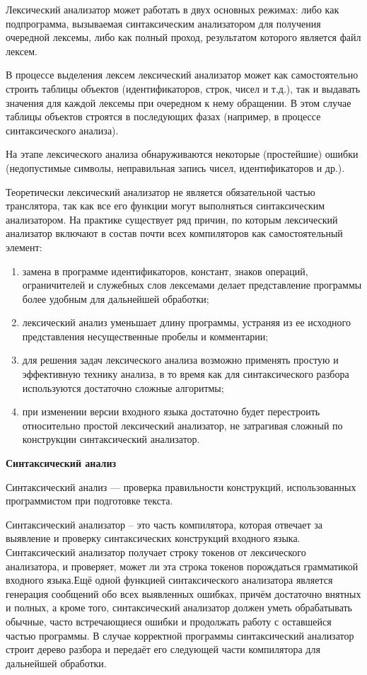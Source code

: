 Лексический анализатор может работать в двух основных режимах: либо как подпрограмма, вызываемая синтаксическим анализатором для получения очередной лексемы, либо как полный проход, результатом которого является файл лексем.

В процессе выделения лексем лексический анализатор может как самостоятельно строить таблицы объектов (идентификаторов, строк, чисел и т.д.), так и выдавать значения для каждой лексемы при очередном к нему обращении. В этом случае таблицы объектов строятся в последующих фазах (например, в процессе синтаксического анализа).

На этапе лексического анализа обнаруживаются некоторые (простейшие) ошибки (недопустимые символы, неправильная запись чисел, идентификаторов и др.).

Теоретически лексический анализатор не является обязательной частью транслятора, так как все его функции могут выполняться синтаксическим анализатором. На практике существует ряд причин, по которым лексический анализатор включают в состав почти всех компиляторов как самостоятельный элемент:

\begin{enumerate}
  \item замена в программе идентификаторов, констант, знаков операций, ограничителей и служебных слов лексемами делает представление программы более удобным для дальнейшей обработки;
  \item лексический анализ уменьшает длину программы, устраняя из ее исходного представления несущественные пробелы и комментарии;
  \item для решения задач лексического анализа возможно применять простую и эффективную технику анализа, в то время как для синтаксического разбора используются достаточно сложные алгоритмы;
  \item при изменении версии входного языка достаточно будет перестроить относительно простой лексический анализатор, не затрагивая сложный по конструкции синтаксический анализатор.
\end{enumerate}

\begin{center}{\bfseries Синтаксический анализ}
\end{center}

\begin{opr}
  Синтаксический анализ — проверка правильности конструкций, использованных программистом при подготовке текста.
\end{opr}

Синтаксический анализатор – это часть компилятора, которая отвечает за выявление и проверку синтаксических конструкций входного языка. Синтаксический анализатор получает строку токенов от лексического анализатора, и проверяет, может ли эта строка токенов порождаться грамматикой входного языка.Ещё одной функцией синтаксического анализатора является генерация сообщений обо всех выявленных ошибках, причём достаточно внятных и полных, а кроме того, синтаксический анализатор должен уметь обрабатывать обычные, часто встречающиеся ошибки и продолжать работу с оставшейся частью программы. В случае корректной программы синтаксический анализатор строит дерево разбора и передаёт его следующей части компилятора для дальнейшей обработки. 

